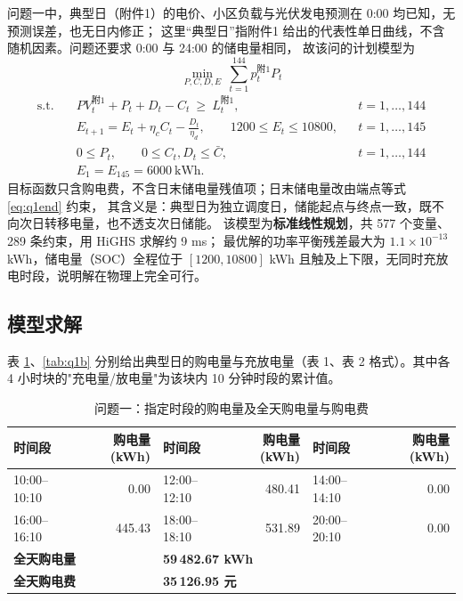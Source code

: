 \documentclass[withoutpreface,bwprint]{cumcmthesis}
\begin{document}
问题一中，典型日（附件1）的电价、小区负载与光伏发电预测在 0:00 均已知，无预测误差，也无日内修正；
这里“典型日”指附件1 给出的代表性单日曲线，不含随机因素。问题还要求 0:00 与 24:00 的储电量相同，
故该问的计划模型为
\begin{equation}
\min_{P,C,D,E}\ \sum_{t=1}^{144}p_t^{\text{附1}}P_t
\label{eq:q1obj}
\end{equation}
\begin{align}
\text{s.t.}\quad
& PV_t^{\text{附1}}+P_t+D_t-C_t\ \ge\ L_t^{\text{附1}}, && t=1,\dots,144 \label{eq:q1bal}\\
& E_{t+1}=E_t+\eta_cC_t-\frac{D_t}{\eta_d},\qquad 1200\le E_t\le10800, && t=1,\dots,145 \label{eq:q1soc}\\
& 0\le P_t,\qquad 0\le C_t,D_t\le\bar C, && t=1,\dots,144 \label{eq:q1cap}\\
& E_1=E_{145}=6000\ \text{kWh}. \label{eq:q1end}
\end{align}
目标函数只含购电费，不含日末储电量残值项；日末储电量改由端点等式 \eqref{eq:q1end} 约束，
其含义是：典型日为独立调度日，储能起点与终点一致，既不向次日转移电量，也不透支次日储能。
该模型为\textbf{标准线性规划}，共 577 个变量、289 条约束，用 HiGHS 求解约 9 ms；
最优解的功率平衡残差最大为 $1.1\times10^{-13}$ kWh，储电量（SOC）全程位于 $[1200,10800]$ kWh
且触及上下限，无同时充放电时段，说明解在物理上完全可行。

\subsection{模型求解}

表 \ref{tab:q1a}、\ref{tab:q1b} 分别给出典型日的购电量与充放电量（表 1、表 2 格式）。其中各 4 小时块的"充电量/放电量"为该块内 10 分钟时段的累计值。

\begin{table}[htbp]
\centering
\caption{问题一：指定时段的购电量及全天购电量与购电费}
\label{tab:q1a}
\begin{tabular}{@{}lrlrlr@{}}
\toprule
时间段 & 购电量(kWh) & 时间段 & 购电量(kWh) & 时间段 & 购电量(kWh) \\
\midrule
10:00--10:10 & 0.00 & 12:00--12:10 & 480.41 & 14:00--14:10 & 0.00 \\
16:00--16:10 & 445.43 & 18:00--18:10 & 531.89 & 20:00--20:10 & 0.00 \\
\midrule
\multicolumn{2}{l}{\textbf{全天购电量}} & \multicolumn{4}{l}{\textbf{59\,482.67 kWh}} \\
\multicolumn{2}{l}{\textbf{全天购电费}} & \multicolumn{4}{l}{\textbf{35\,126.95 元}} \\
\bottomrule
\end{tabular}
\end{table}
\end{document}
